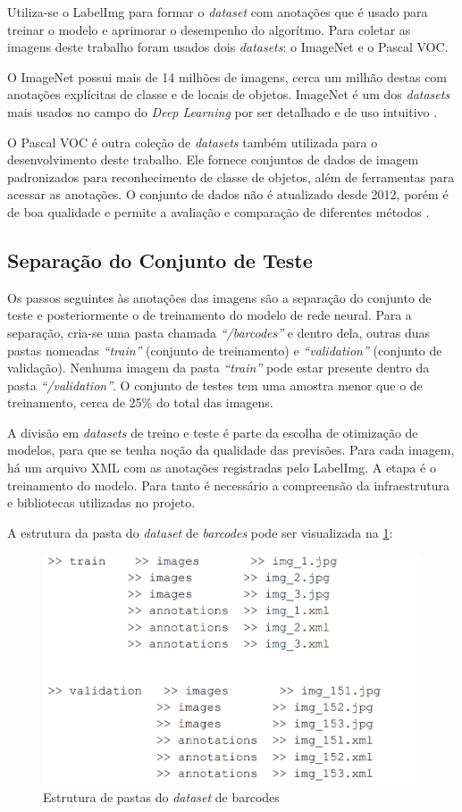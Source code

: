 Utiliza-se o LabelImg para formar o \textit{dataset} com anotações que é usado para treinar o modelo e aprimorar o desempenho do algorítmo. Para coletar as imagens deste trabalho foram usados dois \textit{datasets}: o ImageNet e o Pascal VOC.

O ImageNet possui mais de 14 milhões de imagens, cerca um milhão destas com anotações explícitas de classe e de locais de objetos. ImageNet é um dos \textit{datasets} mais usados no campo do \textit{Deep Learning} por ser detalhado e de uso intuitivo \cite{zhou2017application, deng2009imagenet}.

O Pascal VOC é outra coleção de \textit{datasets} também utilizada para o desenvolvimento deste trabalho. Ele fornece conjuntos de dados de imagem padronizados para reconhecimento de classe de objetos, além de ferramentas para acessar as anotações. O conjunto de dados não é atualizado desde 2012, porém é de boa qualidade e permite a avaliação e comparação de diferentes métodos \cite{zhou2017application, everingham2010pascal}.


\subsection{Separação do Conjunto de Teste}

Os passos seguintes às anotações das imagens são a separação do conjunto de teste e posteriormente o de treinamento do modelo de rede neural. Para a separação, cria-se uma pasta chamada \textit{\enquote{/barcodes}} e dentro dela, outras duas pastas nomeadas \textit{\enquote{train}} (conjunto de treinamento) e \textit{\enquote{validation}} (conjunto de validação). Nenhuma imagem da pasta \textit{\enquote{train}} pode estar presente dentro da pasta \textit{\enquote{/validation}}. O conjunto de testes tem uma amostra menor que o de treinamento, cerca de 25\% do total das imagens.

A divisão em \textit{datasets} de treino e teste é parte da escolha de otimização de modelos, para que se tenha noção da qualidade das previsões. Para cada imagem, há um arquivo XML com as anotações registradas pelo LabelImg. A etapa é o treinamento do modelo. Para tanto é necessário a compreensão da infraestrutura e bibliotecas utilizadas no projeto.

A estrutura da pasta do \textit{dataset} de \textit{barcodes} pode ser visualizada na \ref{fig:foldersDataset}:

\begin{figure}[H]
	\centering
	\includegraphics[width=0.5\linewidth]{figuras/MachineLearning/foldersDataset.png}
	\caption{Estrutura de pastas do \textit{dataset} de barcodes}
	\label{fig:foldersDataset}
\end{figure}

